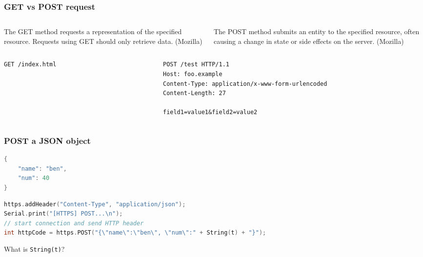 \documentclass[compress, aspectratio=32]{beamer}
\begin{document}
\begin{frame}[fragile]
    \frametitle{GET vs POST request}
    \begin{columns}
        \begin{column}[]{0.5\textwidth}
            \begin{definition}[GET]
                The GET method requests a representation of the specified resource. Requests using GET should only retrieve data. (Mozilla)
            \end{definition}
            
        \end{column}
        \begin{column}[]{0.5\textwidth}
            \begin{definition}[POST]
                The POST method submits an entity to the specified resource, often causing a change in state or side effects on the server. (Mozilla)
            \end{definition}
        \end{column}
    \end{columns}
    \begin{columns}
        \begin{column}[]{0.5\textwidth}
            
            \begin{lstlisting}[numbers=none]
GET /index.html
            \end{lstlisting}
        \end{column}
        \begin{column}[]{0.5\textwidth}
            
            \begin{lstlisting}[numbers=none]
POST /test HTTP/1.1
Host: foo.example
Content-Type: application/x-www-form-urlencoded
Content-Length: 27

field1=value1&field2=value2

            \end{lstlisting}
        \end{column}
    \end{columns}
\end{frame}


\begin{frame}[fragile]
    \frametitle{POST a JSON object}
    \begin{lstlisting}[language=c,numbers=none]
{
    "name": "ben",
    "num": 40
}
    \end{lstlisting}
    \begin{lstlisting}[language=c, numbers=none]
https.addHeader("Content-Type", "application/json");
Serial.print("[HTTPS] POST...\n");
// start connection and send HTTP header
int httpCode = https.POST("{\"name\":\"ben\", \"num\":" + String(t) + "}");
    \end{lstlisting}
    What is \verb|String(t)|?
\end{frame}
\end{document}
